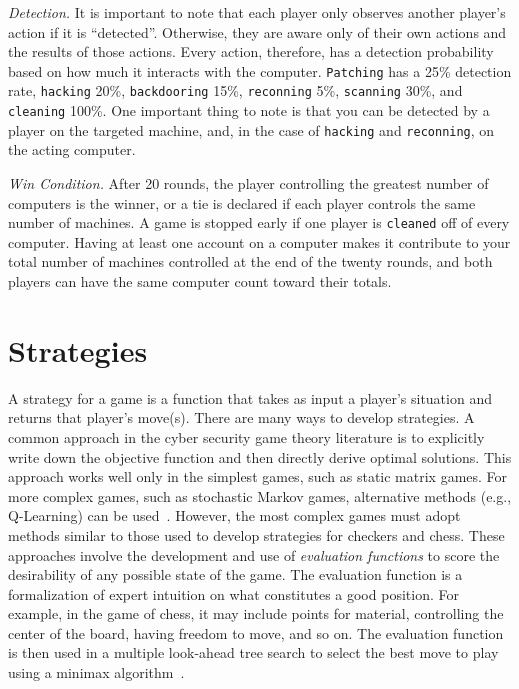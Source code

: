\documentclass{sig-alternate}
\begin{document}
{\em Detection.}
It is important to note that each player only observes another player's action if it is ``detected''. 
Otherwise, they are aware only of their own actions and the results of those actions. 
Every action, therefore, has a detection probability based on how much it interacts with the computer.  
{\tt Patching} has a 25\% detection rate, {\tt hacking} 20\%, {\tt backdooring} 15\%, {\tt reconning} 5\%, {\tt scanning} 30\%, and {\tt cleaning} 100\%. 
One important thing to note is that you can be detected by a player on the targeted machine, and, in the case of {\tt hacking} and {\tt reconning}, on the acting computer. 


{\em Win Condition.}
After 20 rounds, the player controlling the greatest number of computers is the winner, or a tie is declared if each player controls the same number of machines. 
A game is stopped early if one player is {\tt cleaned} off of every computer. 
Having at least one account on a computer makes it contribute to your total number of machines controlled at the end of the twenty rounds, and both players can have the same computer count toward their totals.  


\section{Strategies}
\label{sec:strategies}

A strategy for a game is a function that takes as input a player's situation and returns that player's move(s).
There are many ways to develop strategies. 
A common approach in the cyber security game theory literature is to explicitly write down the objective function and then directly derive optimal solutions. This approach works well only in the simplest games, such as static matrix games. For more complex games, such as stochastic Markov games, alternative methods (e.g., Q-Learning) can be used~\cite{alpcan2006intrusion}. However, the most complex games must adopt methods similar to those used to develop strategies for checkers and chess. These approaches involve the development and use of {\em evaluation functions} to score the desirability of any possible state of the game. The evaluation function is a formalization of expert intuition on what constitutes a good position. For example, in the game of chess, it may include points for material, controlling the center of the board, having freedom to move, and so on. The evaluation function is then used in a multiple look-ahead tree search to select the best move to play using a minimax algorithm~\cite{shannon1950programming}.
\end{document}
